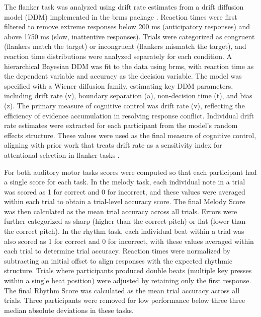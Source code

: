 The flanker task was analyzed using drift rate estimates from a drift diffusion model (DDM) implemented in the brms package \citep{burkner2017brms}. Reaction times were first filtered to remove extreme responses below 200 ms (anticipatory responses) and above 1750 ms (slow, inattentive responses). Trials were categorized as congruent (flankers match the target) or incongruent (flankers mismatch the target), and reaction time distributions were analyzed separately for each condition. A hierarchical Bayesian DDM was fit to the data using brms, with reaction time as the dependent variable and accuracy as the decision variable. The model was specified with a Wiener diffusion family, estimating key DDM parameters, including drift rate (v), boundary separation (a), non-decision time (t), and bias (z). The primary measure of cognitive control was drift rate (v), reflecting the efficiency of evidence accumulation in resolving response conflict. Individual drift rate estimates were extracted for each participant from the model’s random effects structure. These values were used as the final measure of cognitive control, aligning with prior work that treats drift rate as a sensitivity index for attentional selection in flanker tasks \citep{poole2024putting}. 

For both auditory motor tasks scores were computed so that each participant had a single score for each task. In the melody task, each individual note in a trial was scored as 1 for correct and 0 for incorrect, and these values were averaged within each trial to obtain a trial-level accuracy score. The final Melody Score was then calculated as the mean trial accuracy across all trials. Errors were further categorized as sharp (higher than the correct pitch) or flat (lower than the correct pitch). In the rhythm task, each individual beat within a trial was also scored as 1 for correct and 0 for incorrect, with these values averaged within each trial to determine trial accuracy. Reaction times were normalized by subtracting an initial offset to align responses with the expected rhythmic structure. Trials where participants produced double beats (multiple key presses within a single beat position) were adjusted by retaining only the first response. The final Rhythm Score was calculated as the mean trial accuracy across all trials. Three participants were removed for low performance below three three median absolute deviations in these tasks.

